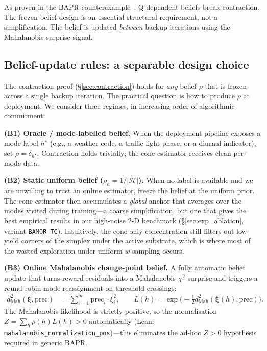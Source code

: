 \begin{remark}
As proven in the BAPR counterexample~\cite{Zhang2025BAPR}, Q-dependent beliefs break contraction.  The frozen-belief design is an essential structural requirement, not a simplification.  The belief is updated \emph{between} backup iterations using the Mahalanobis surprise signal.
\end{remark}

\subsection{Belief-update rules: a separable design choice}
\label{sec:belief_rules}

The contraction proof (\S\ref{sec:contraction}) holds for \emph{any} belief $\rho$ that is frozen across a single backup iteration.  The practical question is how to produce $\rho$ at deployment.  We consider three regimes, in increasing order of algorithmic commitment:

\textbf{(B1) Oracle / mode-labelled belief.}  When the deployment pipeline exposes a mode label $h^\star$ (e.g., a weather code, a traffic-light phase, or a diurnal indicator), set $\rho = \delta_{h^\star}$.  Contraction holds trivially; the cone estimator receives clean per-mode data.

\textbf{(B2) Static uniform belief ($\rho_h = 1/|\mathcal{H}|$).}  When no label is available and we are unwilling to trust an online estimator, freeze the belief at the uniform prior.  The cone estimator then accumulates a \emph{global} anchor that averages over the modes visited during training---a coarse simplification, but one that gives the best empirical results in our high-noise 2-D benchmark (\S\ref{sec:exp_ablation}, variant \texttt{BAMOR-TC}).  Intuitively, the cone-only concentration still filters out low-yield corners of the simplex under the active substrate, which is where most of the wasted exploration under uniform-$w$ sampling occurs.

\textbf{(B3) Online Mahalanobis change-point belief.}  A fully automatic belief update that turns reward residuals into a Mahalanobis $\chi^2$ surprise and triggers a round-robin mode reassignment on threshold crossings:
\begin{align}
    d^2_{\mathrm{Mah}}(\boldsymbol{\xi}, \mathrm{prec}) &= \sum_{i=1}^m \mathrm{prec}_i \cdot \xi_i^2, \qquad
    L(h) = \exp\bigl(-\tfrac{1}{2} d^2_{\mathrm{Mah}}(\boldsymbol{\xi}(h), \mathrm{prec})\bigr).
    \label{eq:mahalanobis}
\end{align}
The Mahalanobis likelihood is strictly positive, so the normalisation $Z = \sum_h \rho(h) L(h) > 0$ automatically (Lean: \texttt{mahalanobis\_normalization\_pos})---this eliminates the ad-hoc $Z > 0$ hypothesis required in generic BAPR.

